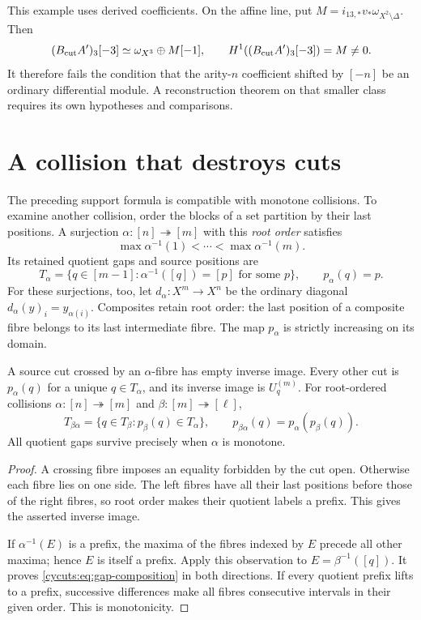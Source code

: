 This example uses derived coefficients. On the affine line, put
$M=i_{13,*}v_*\omega_{X^2\setminus\Delta}$. Then
\[
 (B_{\mathrm{cut}} A')_3[-3]\simeq\omega_{X^3}\oplus M[-1],
 \qquad H^1((B_{\mathrm{cut}} A')_3[-3])=M\ne0.
\]
It therefore fails the condition that the arity-$n$ coefficient shifted
by $[-n]$ be an ordinary differential module. A reconstruction theorem
on that smaller class requires its own hypotheses and comparisons.

\section{A collision that destroys cuts}
\label{cycuts:sec:transport}

The preceding support formula is compatible with monotone collisions.
To examine another collision, order the blocks of a set partition by
their last positions. A surjection $\alpha:[n]\twoheadrightarrow[m]$
with this \emph{root order} satisfies
\[
 \max\alpha^{-1}(1)<\cdots<\max\alpha^{-1}(m).
\]
Its retained quotient gaps and source positions are
\begin{equation}\label{cycuts:eq:retained}
 T_\alpha=\{q\in[m-1]:\alpha^{-1}([q])=[p]\text{ for some }p\},
 \qquad p_\alpha(q)=p.
\end{equation}
For these surjections, too, let $d_\alpha:X^m\to X^n$ be the
ordinary diagonal $d_\alpha(y)_i=y_{\alpha(i)}$. Composites retain
root order: the last position of a composite fibre belongs to its
last intermediate fibre. The map
$p_\alpha$ is strictly increasing on its domain.

\begin{proposition}\label{cycuts:prop:retained}
A source cut crossed by an $\alpha$-fibre has empty inverse image.
Every other cut is $p_\alpha(q)$ for a unique $q\in T_\alpha$,
and its inverse image is $U_q^{(m)}$. For root-ordered collisions
$\alpha:[n]\twoheadrightarrow[m]$ and
$\beta:[m]\twoheadrightarrow[\ell]$,
\begin{equation}\label{cycuts:eq:gap-composition}
 T_{\beta\alpha}=
 \{q\in T_\beta:p_\beta(q)\in T_\alpha\},\qquad
 p_{\beta\alpha}(q)=p_\alpha(p_\beta(q)).
\end{equation}
All quotient gaps survive precisely when $\alpha$ is monotone.
\end{proposition}
\begin{proof}
A crossing fibre imposes an equality forbidden by the cut open.
Otherwise each fibre lies on one side. The left fibres have all their
last positions before those of the right fibres, so root order makes
their quotient labels a prefix. This gives the asserted inverse image.

If $\alpha^{-1}(E)$ is a prefix, the maxima of the fibres indexed
by $E$ precede all other maxima; hence $E$ is itself a prefix.
Apply this observation to $E=\beta^{-1}([q])$. It proves
\eqref{cycuts:eq:gap-composition} in both directions. If every
quotient prefix lifts to a prefix, successive differences make all
fibres consecutive intervals in their given order. This is monotonicity.
\end{proof}

